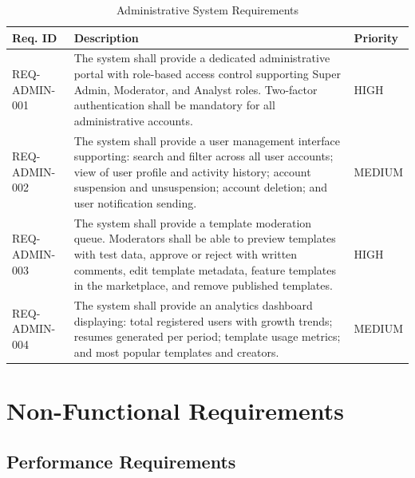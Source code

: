 \documentclass[12pt, a4paper, oneside]{report}
\begin{document}
\begin{table}[H]
\centering
\caption{Administrative System Requirements}
\label{tab:req_admin}
\renewcommand{\arraystretch}{1.5}
\begin{tabularx}{\textwidth}{|p{3cm}|X|p{2cm}|}
\hline
\textbf{Req. ID} & \textbf{Description} & \textbf{Priority} \\
\hline
REQ-ADMIN-001 & The system shall provide a dedicated administrative portal with role-based access control \cite{owasp2021} supporting Super Admin, Moderator, and Analyst roles. Two-factor authentication shall be mandatory for all administrative accounts. & HIGH \\
\hline
REQ-ADMIN-002 & The system shall provide a user management interface supporting: search and filter across all user accounts; view of user profile and activity history; account suspension and unsuspension; account deletion; and user notification sending. & MEDIUM \\
\hline
REQ-ADMIN-003 & The system shall provide a template moderation queue. Moderators shall be able to preview templates with test data, approve or reject with written comments, edit template metadata, feature templates in the marketplace, and remove published templates. & HIGH \\
\hline
REQ-ADMIN-004 & The system shall provide an analytics dashboard displaying: total registered users with growth trends; resumes generated per period; template usage metrics; and most popular templates and creators. & MEDIUM \\
\hline
\end{tabularx}
\end{table}

\section{Non-Functional Requirements}

\subsection{Performance Requirements}
\end{document}
